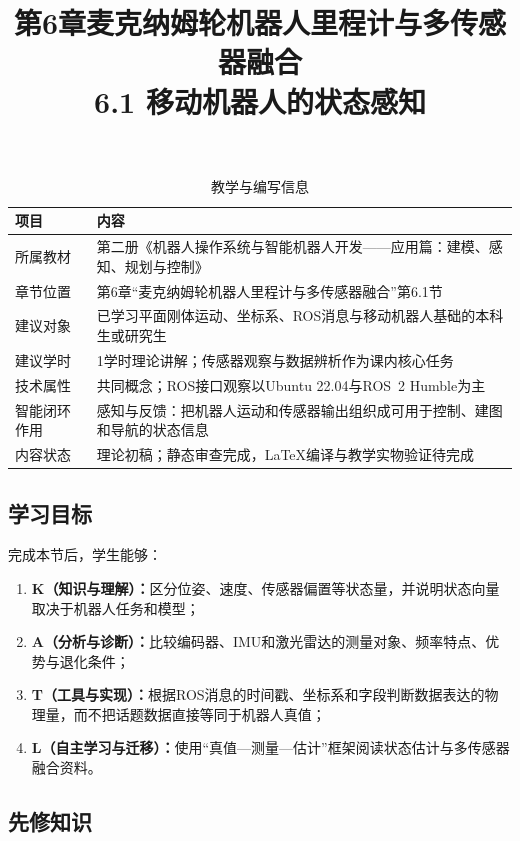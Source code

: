 \documentclass[UTF8,zihao=-4]{ctexart}
\title{第6章麦克纳姆轮机器人里程计与多传感器融合\\
\large 6.1 移动机器人的状态感知}
\author{}
\date{}
\begin{document}
\maketitle

\begin{table}[htbp]
  \centering
  \caption*{教学与编写信息}
  \begin{tabular}{p{}p{}}
    \toprule
    项目 & 内容 \\
    \midrule
    所属教材 & 第二册《机器人操作系统与智能机器人开发——应用篇：建模、感知、规划与控制》 \\
    章节位置 & 第6章“麦克纳姆轮机器人里程计与多传感器融合”第6.1节 \\
    建议对象 & 已学习平面刚体运动、坐标系、ROS消息与移动机器人基础的本科生或研究生 \\
    建议学时 & 1学时理论讲解；传感器观察与数据辨析作为课内核心任务 \\
    技术属性 & 共同概念；ROS接口观察以Ubuntu 22.04与ROS~2 Humble为主 \\
    智能闭环作用 & 感知与反馈：把机器人运动和传感器输出组织成可用于控制、建图和导航的状态信息 \\
    内容状态 & 理论初稿；静态审查完成，LaTeX编译与教学实物验证待完成 \\
    \bottomrule
  \end{tabular}
\end{table}

\subsection*{学习目标}

完成本节后，学生能够：
\begin{enumerate}
  \item \textbf{K（知识与理解）：}区分位姿、速度、传感器偏置等状态量，并说明状态向量取决于机器人任务和模型；
  \item \textbf{A（分析与诊断）：}比较编码器、IMU和激光雷达的测量对象、频率特点、优势与退化条件；
  \item \textbf{T（工具与实现）：}根据ROS消息的时间戳、坐标系和字段判断数据表达的物理量，而不把话题数据直接等同于机器人真值；
  \item \textbf{L（自主学习与迁移）：}使用“真值---测量---估计”框架阅读状态估计与多传感器融合资料。
\end{enumerate}

\subsection*{先修知识}
\end{document}
